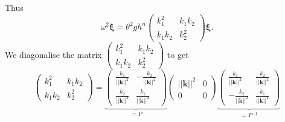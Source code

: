 \documentclass[a4paper, 11pt]{article}
\begin{document}
Thus
\begin{equation*}
\omega^2\boldsymbol{\xi}=\theta^2 g h^n\begin{pmatrix}k_1^2&k_1k_2\\ k_1k_2 &k_2^2\end{pmatrix}\boldsymbol{\xi}.
\end{equation*}
We diagonalise the matrix $\begin{pmatrix}k_1^2&k_1k_2\\ k_1k_2 &k_2^2\end{pmatrix}$ to get
\begin{equation*}
\begin{pmatrix}k_1^2&k_1k_2\\ k_1k_2 &k_2^2\end{pmatrix}=\underbrace{\begin{pmatrix}\frac{k_1}{||\boldsymbol{k}||^2}&-\frac{k_2}{||\boldsymbol{k}||^2}\\ \frac{k_2}{||\boldsymbol{k}||^2} &\frac{k_1}{||\boldsymbol{k}||^2}\end{pmatrix}}_{=P}
\begin{pmatrix}||\boldsymbol{k}||^2&0\\ 0 &0\end{pmatrix}
\underbrace{\begin{pmatrix}\frac{k_1}{||\boldsymbol{k}||^2}&\frac{k_2}{||\boldsymbol{k}||^2}\\ -\frac{k_2}{||\boldsymbol{k}||^2} &\frac{k_1}{||\boldsymbol{k}||^2}\end{pmatrix}}_{=P^{-1}}
\end{equation*}
\end{document}
